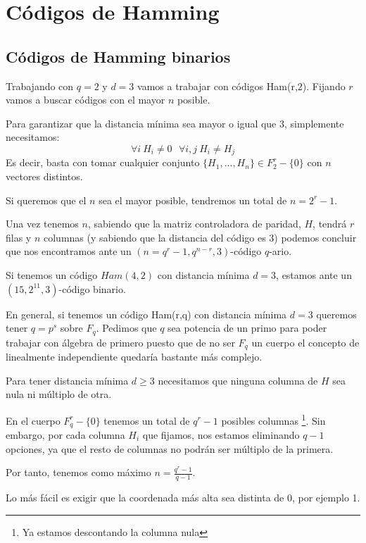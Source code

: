 \chapter{Códigos de Hamming}

\section{Códigos de Hamming binarios}
Trabajando con $q=2$ y $d=3$ vamos a trabajar con códigos Ham(r,2). Fijando $r$ vamos a buscar códigos con el mayor $n$ posible.

Para garantizar que la distancia mínima sea mayor o igual que 3, simplemente necesitamos:
\[\forall i \ H_i \neq 0 \ \ \ \forall i,j \ H_i \neq H_j\]
Es decir, basta con tomar cualquier conjunto $\{H_1,...,H_n\}\in F_2^r-\{0\}$ con $n$ vectores distintos.

Si queremos que el $n$ sea el mayor posible, tendremos un total de $n=2^r-1$.

Una vez tenemos $n$, sabiendo que la matriz controladora de paridad, $H$, tendrá $r$ filas y $n$ columnas (y sabiendo que la distancia del código es 3) podemos concluir que nos encontramos ante un $(n=q^r-1,q^{n-r},3)$-código $q$-ario.

\begin{example}
Si tenemos un código $Ham(4,2)$ con distancia mínima $d=3$, estamos ante un $(15,2^{11},3)$-código binario.

\end{example}

En general, si tenemos un código Ham(r,q) con distancia mínima $d=3$ queremos tener $q=p^s$ sobre $F_q$. Pedimos que $q$ sea potencia de un primo para poder trabajar con álgebra de primero puesto que de no ser $F_q$ un cuerpo el concepto de linealmente independiente quedaría bastante más complejo.

Para tener distancia mínima $d \geq 3$ necesitamos que ninguna columna de $H$ sea nula ni múltiplo de otra.

En el cuerpo $F_q^r-\{0\}$ tenemos un total de $q^r-1$ posibles columnas \footnote{Ya estamos descontando la columna nula}. Sin embargo, por cada columna $H_i$ que fijamos, nos estamos eliminando $q-1$ opciones, ya que el resto de columnas no podrán ser múltiplo de la primera.

Por tanto, tenemos como máximo $n=\frac{q^r-1}{q-1}$.

Lo más fácil es exigir que la coordenada más alta sea distinta de 0, por ejemplo 1.

